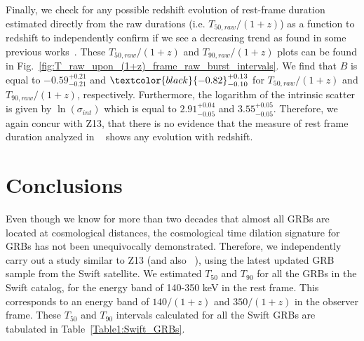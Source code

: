 \documentclass[prd,nofootinbib,preprintnumbers,floatfix]{revtex4}  %
\newcommand{\rthis}[1]{\textcolor{black}{#1}}
\begin{document}
 Finally, we  check for any possible redshift evolution of rest-frame duration estimated directly from the raw durations (i.e. $T_{50,raw}/(1+z)$) as a function to redshift to independently confirm if we see a decreasing trend as found in some previous works~\cite{Pelangeon,Petrosian13}. These $T_{50,raw}/(1+z)$ and $T_{90,raw}/(1+z)$ plots can be found in Fig.~\ref{fig:T_raw_upon_(1+z)_frame_raw_burst_intervals}. 
 We find that $B$ is equal to $-0.59^{+0.21}_{-0.21}$ and $\rthis{-0.82}^{+0.13}_{-0.10}$
for  $T_{50,raw}/(1+z)$ and $T_{90,raw}/(1+z)$, respectively. Furthermore, the logarithm of the intrinsic scatter is given by $\ln (\sigma_{int})$ which is equal to  $2.91^{+0.04}_{-0.05}$ and $3.55^{+0.05}_{-0.05}$. Therefore, we again concur with Z13, that there is no evidence that the  measure of rest frame duration analyzed in ~\cite{Pelangeon,Petrosian13} shows any evolution with redshift.



\section{Conclusions}
\label{sec:conclusions}

Even though we know for more than two decades that almost all GRBs are located at cosmological distances, the cosmological time dilation signature for GRBs has not been unequivocally demonstrated. 
Therefore, we independently carry out a study similar to Z13 (and also ~\cite{Butler}), using the latest updated GRB sample from the Swift satellite. We estimated $T_{50}$ and $T_{90}$ for all the  GRBs in the Swift catalog, for the energy band of 140-350 keV in the rest frame. This corresponds to an energy band of $140/(1+z)$ and $350/(1+z)$ in the observer frame. These $T_{50}$ and $T_{90}$ intervals calculated for all the Swift GRBs are tabulated  in Table~\ref{Table1:Swift_GRBs}. 
\end{document}
